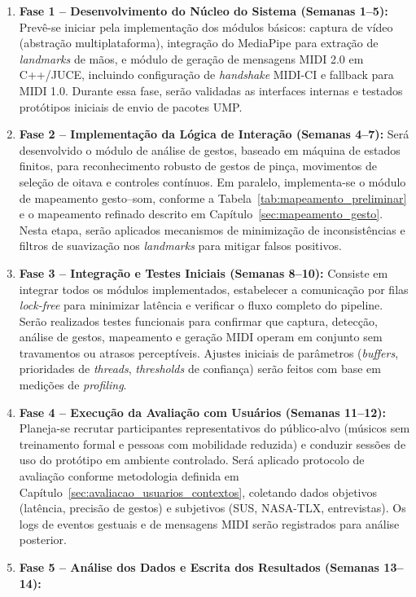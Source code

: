 \begin{enumerate}
    \item \textbf{Fase 1 – Desenvolvimento do Núcleo do Sistema (Semanas 1–5):}  
    Prevê-se iniciar pela implementação dos módulos básicos: captura de vídeo (abstração multiplataforma), integração do MediaPipe para extração de \textit{landmarks} de mãos, e módulo de geração de mensagens MIDI 2.0 em C++/JUCE, incluindo configuração de \textit{handshake} MIDI-CI e fallback para MIDI 1.0. Durante essa fase, serão validadas as interfaces internas e testados protótipos iniciais de envio de pacotes UMP.
    \item \textbf{Fase 2 – Implementação da Lógica de Interação (Semanas 4–7):}  
    Será desenvolvido o módulo de análise de gestos, baseado em máquina de estados finitos, para reconhecimento robusto de gestos de pinça, movimentos de seleção de oitava e controles contínuos. Em paralelo, implementa-se o módulo de mapeamento gesto–som, conforme a Tabela~\ref{tab:mapeamento_preliminar} e o mapeamento refinado descrito em Capítulo~\ref{sec:mapeamento_gesto}. Nesta etapa, serão aplicados mecanismos de minimização de inconsistências e filtros de suavização nos \textit{landmarks} para mitigar falsos positivos.
    \item \textbf{Fase 3 – Integração e Testes Iniciais (Semanas 8–10):}  
    Consiste em integrar todos os módulos implementados, estabelecer a comunicação por filas \textit{lock-free} para minimizar latência e verificar o fluxo completo do pipeline. Serão realizados testes funcionais para confirmar que captura, detecção, análise de gestos, mapeamento e geração MIDI operam em conjunto sem travamentos ou atrasos perceptíveis. Ajustes iniciais de parâmetros (\textit{buffers}, prioridades de \textit{threads}, \textit{thresholds} de confiança) serão feitos com base em medições de \textit{profiling}.
    \item \textbf{Fase 4 – Execução da Avaliação com Usuários (Semanas 11–12):}  
    Planeja-se recrutar participantes representativos do público-alvo (músicos sem treinamento formal e pessoas com mobilidade reduzida) e conduzir sessões de uso do protótipo em ambiente controlado. Será aplicado protocolo de avaliação conforme metodologia definida em Capítulo~\ref{sec:avaliacao_usuarios_contextos}, coletando dados objetivos (latência, precisão de gestos) e subjetivos (SUS, NASA-TLX, entrevistas). Os logs de eventos gestuais e de mensagens MIDI serão registrados para análise posterior.
    \item \textbf{Fase 5 – Análise dos Dados e Escrita dos Resultados (Semanas 13–14):}  

\end{enumerate}
